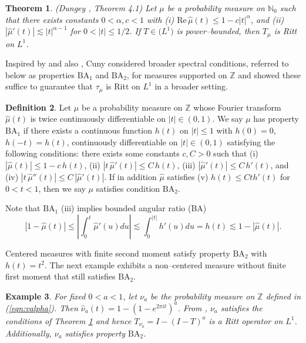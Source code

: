 \documentclass[11pt]{amsart}
\newtheorem{thm}{Theorem}[section]
\newtheorem{example}[thm]{Example}
\theoremstyle{definition}
\newtheorem{defn}[thm]{Definition} %
\theoremstyle{remark}
\begin{document}
 \begin{thm} (Dungey \cite{Dunn}, Theorem 4.1) \label{thm:D}
Let $\mu$ be a probability measure on $\mathbb N_0$ such that there exists constants $0<\alpha,c<1$ with (i) $\mbox{Re} \, \hat\mu(t) \le 1-c |t|^{\alpha}$, and 
(ii)  $|\hat\mu'(t)|\lesssim |t|^{\alpha-1}$ for $0<|t|\le 1/2$.
If $T\in \mathcal(L^1)$ is power--bounded, then $T_{\mu}$ is Ritt on $L^1$.
\end{thm}
 
 
 Inspired by %
 \cite{Dunn} and also  \cite{Chris}, Cuny  \cite{Cuny-weak} considered broader spectral conditions, referred to below as properties $\text{BA}_1$ and $\text{BA}_2$, for measures supported on $\mathbb Z$ and showed these suffice to guarantee that $\tau_{\mu}$  is Ritt on $L^1$  in a broader setting.

\begin{defn} %
Let $\mu$ be a probability measure on $\mathbb Z$ whose Fourier transform $\hat\mu(t)$ %
is twice continuously differentiable on $|t|\in (0,1)$. We say $\mu$ has property {\bf $\text{BA}_1$} if there exists a continuous function $h(t)$ on $|t|\le 1$ with $h(0)=0$, $h(-t)=h(t)$, continuously differentiable on $|t|\in (0,1)$ satisfying the following conditions: there exists some constants $c,C>0$ such that
(i)  $|\hat\mu(t)|\le 1-c\, h(t)$,
(ii)  $|t \, \hat\mu'(t)|\le C\, h(t)$,
(iii)  $|\hat\mu'(t)|\le C\, h'(t)$, and
(iv)  $|t \, \hat\mu''(t)|\le C\, |\hat\mu'(t)|$. 
 If in addition $\hat\mu$ satisfies
(v) $h(t)\le C th'(t)$ for $0<t<1$, then we say $\mu$ satisfies condition {\bf $\text{BA}_2$}. 
\end{defn}


Note that  $\text{BA}_1$ (iii) implies bounded angular ratio (BA)
\begin{equation*} |1-\hat\mu(t)| \le | \int_0^t \hat\mu'(u) du | \lesssim \int_0^{|t|}  h'(u) du =  h(t) \lesssim 1-|\hat\mu(t)|.
\end{equation*}


Centered measures with finite second moment satisfy property $\text{BA}_2$ with $h(t)=t^2$. 
The next example exhibits a non--centered measure  without finite first moment that still satisfies $\text{BA}_2$.
\begin{example}   For fixed $0<a<1$, let $\nu_{a}$ be the probability measure on $\mathbb Z$ defined in (\ref{eqn:valpha}). 
Then $\hat\nu_{a}(t) = 1-(1-e^{2\pi i t})^{a}$. From \cite{Dunn}, $\nu_{a}$ satisfies the conditions of Theorem \ref{thm:D} and hence $T_{\nu_{a}} = I-(I-T)^{a}$ is a Ritt operator on $L^1$. Additionally, $\nu_{a}$ satisfies property $\text{BA}_2$.

 
\end{example}
\end{document}
